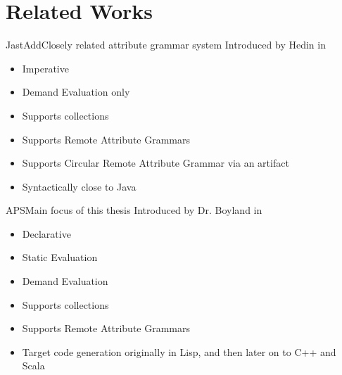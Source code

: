 \section{Related Works}

\begin{frame}{JastAdd}{Closely related attribute grammar system}
Introduced by Hedin in \cite{DBLP:journals/entcs/HedinM01}
		
\begin{itemize}
    \item \alert{Imperative}
    \item \alert{Demand Evaluation only}
    \item Supports collections
    \item Supports Remote Attribute Grammars
    \item \alert{Supports Circular Remote Attribute Grammar} via an artifact
    \item Syntactically close to Java
\end{itemize}

\end{frame}


\begin{frame}{APS}{Main focus of this thesis}
Introduced by Dr. Boyland in \cite{10.5555/924544}
		
\begin{itemize}
    \item \alert{Declarative}
    \item \alert{Static Evaluation}
    \item Demand Evaluation
    \item Supports collections
    \item Supports Remote Attribute Grammars
    \item Target code generation originally in Lisp, and then later on to C++ and Scala
\end{itemize}

\end{frame}


